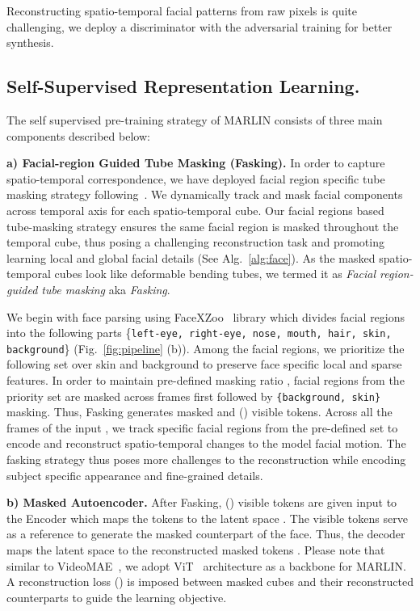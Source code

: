 \documentclass[10pt,twocolumn,letterpaper]{article}
\newcommand{\encoder}{}
\newcommand{\decoder}{}
\newcommand{\discriminator}{}
\begin{document}
Reconstructing spatio-temporal facial patterns from raw pixels is quite challenging, we deploy a discriminator \discriminator with the adversarial training for better synthesis.
 

\subsection{Self-Supervised Representation Learning.}
The self supervised pre-training strategy of MARLIN consists of three main components described below:

\noindent \textbf{a) Facial-region Guided Tube Masking (Fasking).} 
In order to capture spatio-temporal correspondence, we have deployed facial region specific tube masking strategy following~\cite{tongVideoMAE2022}. We dynamically track and mask facial components across temporal axis for each spatio-temporal cube. Our facial regions based tube-masking strategy ensures the same facial region is masked throughout the temporal cube, thus posing a challenging reconstruction task and promoting learning local and global facial details (See Alg.~\ref{alg:face}). As the masked spatio-temporal cubes look like deformable bending tubes, we termed it as \textit{Facial region-guided tube masking} aka \textit{Fasking}.

We begin with face parsing using FaceXZoo~\cite{wangFaceXZoo2021} library which divides facial regions into the following parts \{\texttt{left-eye, right-eye, nose, mouth, hair, skin, background}\} (Fig.~\ref{fig:pipeline} (b)). Among the facial regions, we prioritize the following set  
over skin and background to preserve face specific local and sparse features. 
In order to maintain pre-defined masking ratio , facial regions from the priority set  are masked across frames first followed by \texttt{\{background, skin\}} masking. Thus, Fasking generates  masked and () visible tokens. Across all the frames of the input , we track specific facial regions from the pre-defined set to encode and reconstruct spatio-temporal changes to the model facial motion. The fasking strategy thus poses more challenges to the reconstruction while encoding subject specific appearance and fine-grained details.

\noindent \textbf{b) Masked Autoencoder.} 
After Fasking, () visible tokens are given input to the Encoder \encoder which maps the tokens to the latent space . The visible tokens serve as a reference to generate the masked counterpart of the face. Thus, the decoder \decoder maps the latent space  to the reconstructed masked tokens . Please note that similar to VideoMAE~\cite{tongVideoMAE2022}, we adopt ViT~\cite{dosovitskiyImage2021} architecture as a backbone for MARLIN. A reconstruction loss () is imposed between masked cubes  and their reconstructed counterparts  to guide the learning objective. 
\end{document}
